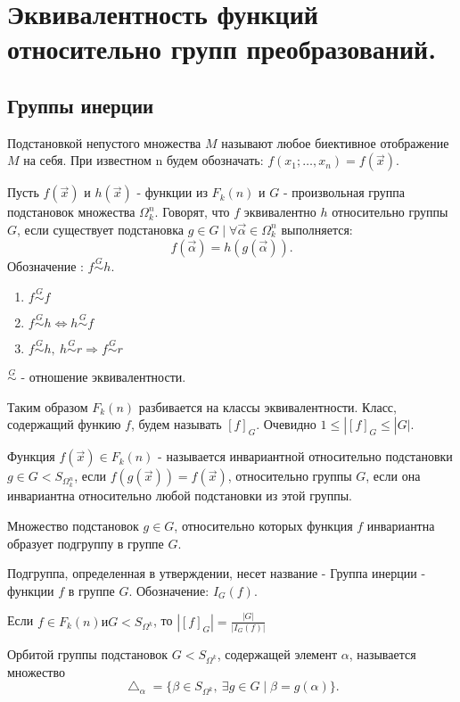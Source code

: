 \section{Эквивалентность функций относительно групп преобразований.}

\subsection{Группы инерции}

\opr Подстановкой непустого множества $M$ называют любое биективное отображение $M$ на себя.
При известном n будем обозначать: $f(x_1; \ldots, x_n)=f(\vec{x})$.

\opr Пусть $f(\vec{x})$ и $h(\vec{x})$ - функции из $F_k(n)$ и $G$ - произвольная группа подстановок множества $\Omega_k^n$.
Говорят, что $f$ эквивалентно $h$ относительно группы $G$, если существует подстановка $g \in G \mid \forall \vec{\alpha} \in \Omega_k^n$ выполняется:
$$
f(\vec{\alpha})=h(g(\vec{\alpha})).
$$
Обозначение : $f \stackrel{G}{\sim} h$.
 
\utv
\begin{enumerate}
  \item $f \stackrel{G}{\sim} f$
  \item $f \stackrel{G}{\sim} h \Leftrightarrow h \stackrel{G}{\sim} f$
  \item $f \stackrel{G}{\sim} h, \  h \stackrel{G}{\sim} r \Rightarrow f \stackrel{G}{\sim} r$
\end{enumerate}

$\stackrel{G}{\sim}$ - отношение эквивалентности.

Таким образом $F_k(n)$ разбивается на классы эквивалентности. Класс, содержащий функию $f$, будем называть $[f]_G$.
Очевидно $1 \leq |[f]_G\leq|G|$.

\opr Функция $f(\vec{x}) \in F_k(n) $ - называется инвариантной относительно подстановки $g \in G < S_{\Omega_k^n}$,
если $f(g(\vec{x})) = f(\vec{x})$, относительно группы $G$, если она инвариантна относительно любой подстановки из этой группы.

\utv Множество подстановок $g \in G$, относительно которых функция $f$ инвариантна образует подгруппу в группе $G$.

\opr Подгруппа, определенная в утверждении, несет название - Группа инерции - функции $f$ в группе $G$. Обозначение: $I_G(f)$.

\thr Если $f\in F_k(n) и G < S_{\Omega^k}$, то $|[f]_G|=\frac{|G|}{|I_G(f)|}$

\opr Орбитой группы подстановок $G < S_{\Omega^k}$, содержащей элемент $\alpha$, называется множество
$$
\bigtriangleup_\alpha = \{ \beta \in S_{\Omega^k},\  \exists g\in G \mid \beta =g(\alpha)\}.
$$

